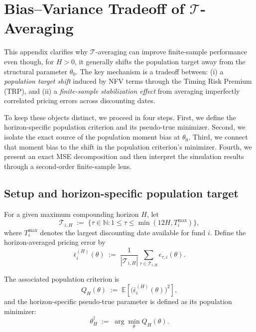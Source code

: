 
\section{Bias--Variance Tradeoff of $\mathcal{T}$-Averaging}
\label{sec:appendix_bias_variance}

This appendix clarifies why $\mathcal{T}$-averaging can improve finite-sample performance even though, for $H>0$, it generally shifts the population target away from the structural parameter $\theta_0$.
The key mechanism is a tradeoff between:
(i) a \emph{population target shift} induced by NFV terms through the Timing Risk Premium (TRP), and
(ii) a \emph{finite-sample stabilization effect} from averaging imperfectly correlated pricing errors across discounting dates.

To keep these objects distinct, we proceed in four steps.
First, we define the horizon-specific population criterion and its pseudo-true minimizer.
Second, we isolate the exact source of the population moment bias at $\theta_0$.
Third, we connect that moment bias to the shift in the population criterion's minimizer.
Fourth, we present an exact MSE decomposition and then interpret the simulation results through a second-order finite-sample lens.

\subsection{Setup and horizon-specific population target}
\label{sec:appendix_bv_setup}

For a given maximum compounding horizon $H$, let
\[
\mathcal{T}_{i,H}
\;:=\;
\bigl\{
\tau \in \mathbb{N} : 1 \le \tau \le \min(12H, T_i^{\max})
\bigr\},
\]
where $T_i^{\max}$ denotes the largest discounting date available for fund $i$.
Define the horizon-averaged pricing error by
\begin{equation}
	\label{eq:avg_eps_H_blueprint}
	\bar{\epsilon}_i^{(H)}(\theta)
	\;:=\;
	\frac{1}{|\mathcal{T}_{i,H}|}
	\sum_{\tau \in \mathcal{T}_{i,H}}
	\epsilon_{\tau,i}(\theta).
\end{equation}

The associated population criterion is
\begin{equation}
	\label{eq:QH_blueprint}
	Q_H(\theta)
	\;:=\;
	\mathbb{E}\!\left[
	\bigl(\bar{\epsilon}_i^{(H)}(\theta)\bigr)^2
	\right],
\end{equation}
and the horizon-specific pseudo-true parameter is defined as its population minimizer:
\begin{equation}
	\label{eq:pseudotrue_blueprint}
	\theta_H^\dagger
	\;:=\;
	\arg\min_\theta Q_H(\theta).
\end{equation}

